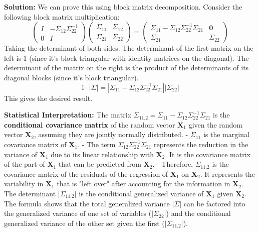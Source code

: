 \textbf{Solution:}
We can prove this using block matrix decomposition. Consider the following block matrix multiplication:
$$ \begin{pmatrix} I & -\Sigma_{12}\Sigma_{22}^{-1} \\ 0 & I \end{pmatrix} \begin{pmatrix} \Sigma_{11} & \Sigma_{12} \\ \Sigma_{21} & \Sigma_{22} \end{pmatrix} = \begin{pmatrix} \Sigma_{11} - \Sigma_{12}\Sigma_{22}^{-1}\Sigma_{21} & \mathbf{0} \\ \Sigma_{21} & \Sigma_{22} \end{pmatrix} $$
Taking the determinant of both sides. The determinant of the first matrix on the left is 1 (since it's block triangular with identity matrices on the diagonal). The determinant of the matrix on the right is the product of the determinants of its diagonal blocks (since it's block triangular).
$$ 1 \cdot |\Sigma| = |\Sigma_{11} - \Sigma_{12}\Sigma_{22}^{-1}\Sigma_{21}| |\Sigma_{22}| $$
This gives the desired result.

\textbf{Statistical Interpretation:}
The matrix $\Sigma_{11.2} = \Sigma_{11} - \Sigma_{12}\Sigma_{22}^{-1}\Sigma_{21}$ is the \textbf{conditional covariance matrix} of the random vector $\mathbf{X}_1$ given the random vector $\mathbf{X}_2$, assuming they are jointly normally distributed.
- $\Sigma_{11}$ is the marginal covariance matrix of $\mathbf{X}_1$.
- The term $\Sigma_{12}\Sigma_{22}^{-1}\Sigma_{21}$ represents the reduction in the variance of $\mathbf{X}_1$ due to its linear relationship with $\mathbf{X}_2$. It is the covariance matrix of the part of $\mathbf{X}_1$ that can be predicted from $\mathbf{X}_2$.
- Therefore, $\Sigma_{11.2}$ is the covariance matrix of the residuals of the regression of $\mathbf{X}_1$ on $\mathbf{X}_2$. It represents the variability in $\mathbf{X}_1$ that is "left over" after accounting for the information in $\mathbf{X}_2$.
The determinant $|\Sigma_{11.2}|$ is the conditional generalized variance of $\mathbf{X}_1$ given $\mathbf{X}_2$. The formula shows that the total generalized variance $|\Sigma|$ can be factored into the generalized variance of one set of variables ($|\Sigma_{22}|$) and the conditional generalized variance of the other set given the first ($|\Sigma_{11.2}|$).
